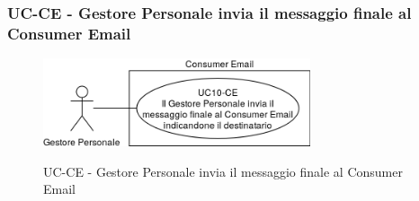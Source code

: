 \subsubsection{UC\theuccount-CE - Gestore Personale invia il messaggio finale al Consumer Email}
	\begin{figure}[H]
		\centering
		\includegraphics[width=0.7\textwidth]{img/casi_d'uso/UC10.png}\\
		\caption{UC\theuccount-CE - Gestore Personale invia il messaggio finale al Consumer Email}
	\end{figure}
